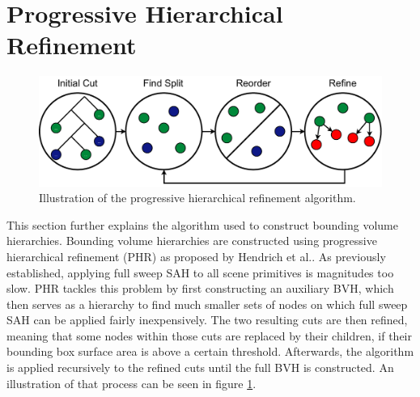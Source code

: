 \section{Progressive Hierarchical Refinement}
\label{phr}
\begin{figure}[H]
    \centering
    \includegraphics[width=400pt]{images/phr_algorithm.pdf}
    \caption{Illustration of the progressive hierarchical refinement algorithm.}
    \label{fig:phr}
\end{figure}
This section further explains the algorithm used to construct bounding volume hierarchies. Bounding volume hierarchies are constructed using progressive hierarchical refinement (PHR) as proposed by Hendrich et al.\cite{hendrich_parallel_2017}. As previously established, applying full sweep SAH to all scene primitives is magnitudes too slow. PHR tackles this problem by first constructing an auxiliary BVH, which then serves as a hierarchy to find much smaller sets of nodes on which full sweep SAH can be applied fairly inexpensively. The two resulting cuts are then refined, meaning that some nodes within those cuts are replaced by their children, if their bounding box surface area is above a certain threshold. Afterwards, the algorithm is applied recursively to the refined cuts until the full BVH is constructed. An illustration of that process can be seen in figure \ref{fig:phr}.


